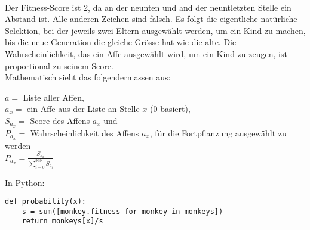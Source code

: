 \documentclass[11pt,a4paper,ngerman]{article}
\begin{document}
\begin{addmargin}[2em]{0em}
\\
\end{addmargin}

\setlength\parindent{0pt}
Der Fitness-Score ist 2, da an der neunten und and der neuntletzten Stelle ein Abstand ist. Alle anderen Zeichen sind falsch. Es folgt die eigentliche natürliche Selektion, bei der jeweils zwei Eltern ausgewählt werden, um ein Kind zu machen, bis die neue Generation die gleiche Grösse hat wie die alte. Die Wahrscheinlichkeit, das ein Affe ausgewählt wird, um ein Kind zu zeugen, ist proportional zu seinem Score.\\

Mathematisch sieht das folgendermassen aus:\\

\begin{addmargin}[2em]{0em}
$ a = $ Liste aller Affen,\\
$ a_x = $ ein Affe aus der Liste an Stelle $x$ (0-basiert),\\
$ S_{a_x} = $ Score des Affens $ a_x $ und \\
$ P_{a_x} = $ Wahrscheinlichkeit des Affens $ a_x $, für die Fortpflanzung ausgewählt zu werden\\

\Large$ P_{a_x} = \frac{S_{a_x}}{\sum_{i=0}^{999} S_{a_i}} $\\
\end{addmargin}

\normalsize
In Python:


\begin{addmargin}[2em]{0em}
\begin{lstlisting}
def probability(x):
    s = sum([monkey.fitness for monkey in monkeys])
    return monkeys[x]/s
\end{lstlisting}
\end{addmargin}
\end{document}
